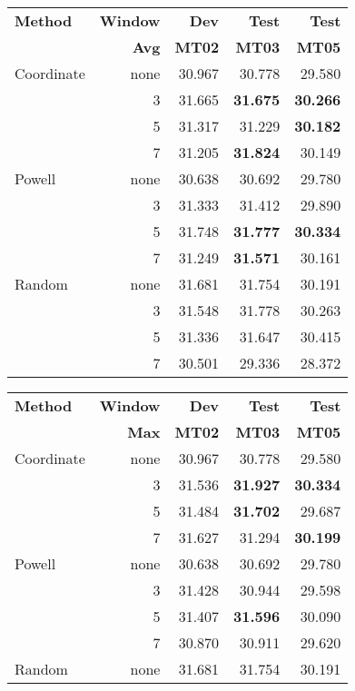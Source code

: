 \documentclass[11pt,tightenlines,kern-1pt]{article}
\begin{document}
\begin{table*}[htb!]
\begin{tabular}{|l|rrrr|}
\hline \bf Method  & \bf Window & \bf Dev & \bf Test & \bf Test \\
                   & \bf Avg    & \bf MT02 & \bf MT03 & \bf MT05 \\ \hline
Coordinate & none &  30.967 & 30.778 & 29.580 \\
           & 3  & 31.665  & {\bf 31.675}  & {\bf 30.266} \\
           & 5  & 31.317  & 31.229  & {\bf 30.182}  \\
           & 7  & 31.205  & {\bf 31.824}  & 30.149 \\ \hline
Powell     & none & 30.638 & 30.692  & 29.780 \\ 
           & 3  & 31.333  & 31.412  & 29.890 \\
           & 5  & 31.748  & {\bf 31.777} &  {\bf 30.334} \\
           & 7  & 31.249  & {\bf 31.571} &  30.161 \\ \hline
Random     & none & 31.681 & 31.754 & 30.191 \\
           & 3  & 31.548  & 31.778  & 30.263 \\
           & 5  & 31.336  & 31.647  & 30.415  \\
           & 7  & 30.501  & 29.336  & 28.372 \\
\hline
\end{tabular}
\begin{tabular}{|l|rrrr|}
\hline \bf Method  & \bf Window & \bf Dev & \bf Test & \bf Test \\
                   & \bf Max    & \bf MT02 & \bf MT03 & \bf MT05 \\ \hline
Coordinate & none &  30.967 & 30.778 & 29.580 \\
           & 3  & 31.536  & {\bf 31.927} & {\bf 30.334} \\
           & 5  & 31.484   & {\bf 31.702}  &  29.687  \\
           & 7  & 31.627 &  31.294 & {\bf 30.199} \\ \hline
Powell     & none & 30.638 & 30.692 & 29.780 \\
           & 3  & 31.428  & 30.944  & 29.598 \\
           & 5  & 31.407  & {\bf 31.596} & 30.090  \\
           & 7  & 30.870  & 30.911 & 29.620  \\ \hline
Random     & none & 31.681 & 31.754 & 30.191 \\

\end{tabular}
\end{table*}
\end{document}
